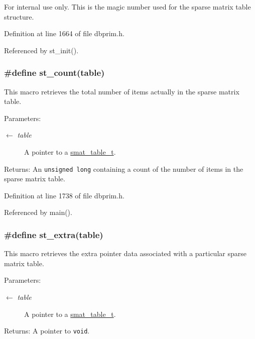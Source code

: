 \begin{Desc}
\item[For internal use only.]
This is the magic number used for the sparse matrix table structure.\end{Desc}


Definition at line 1664 of file dbprim.h.

Referenced by st\_\-init().\hypertarget{group__dbprim__smat_ga38}{
\subsubsection[st\_\-count]{\setlength{\rightskip}{0pt plus 5cm}\#define st\_\-count(table)}}
\label{group__dbprim__smat_ga38}


This macro retrieves the total number of items actually in the sparse matrix table.

\begin{Desc}
\item[Parameters:]
\begin{description}
\item[\mbox{$\leftarrow$} {\em table}]A pointer to a \hyperlink{group__dbprim__smat_ga0}{smat\_\-table\_\-t}.\end{description}
\end{Desc}
\begin{Desc}
\item[Returns:]An {\tt unsigned long} containing a count of the number of items in the sparse matrix table.\end{Desc}


Definition at line 1738 of file dbprim.h.

Referenced by main().\hypertarget{group__dbprim__smat_ga39}{
\subsubsection[st\_\-extra]{\setlength{\rightskip}{0pt plus 5cm}\#define st\_\-extra(table)}}
\label{group__dbprim__smat_ga39}


This macro retrieves the extra pointer data associated with a particular sparse matrix table.

\begin{Desc}
\item[Parameters:]
\begin{description}
\item[\mbox{$\leftarrow$} {\em table}]A pointer to a \hyperlink{group__dbprim__smat_ga0}{smat\_\-table\_\-t}.\end{description}
\end{Desc}
\begin{Desc}
\item[Returns:]A pointer to {\tt void}.\end{Desc}


